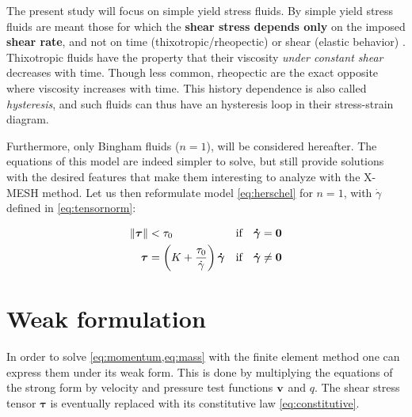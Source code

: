 \documentclass[11 pt]{report}
\begin{document}
The present study will focus on simple yield stress fluids. By simple yield stress fluids are meant those for which the \textbf{shear stress depends only} on the imposed \textbf{shear rate}, and not on time (thixotropic/rheopectic) or shear (elastic behavior) \cite{simpleyield}. Thixotropic fluids have the property that their viscosity \textit{under constant shear} decreases with time. Though less common, rheopectic are the exact opposite where viscosity increases with time. This history dependence is also called \textit{hysteresis}, and such fluids can thus have an hysteresis loop in their stress-strain diagram. 

Furthermore, only Bingham fluids ($n=1$), will be considered hereafter. The equations of this model are indeed simpler to solve, but still provide solutions with the desired features that make them interesting to analyze with the X-MESH method. Let us then reformulate model \eqref{eq:herschel} for $n=1$, with $\dot\gamma$ defined in \eqref{eq:tensornorm}:
\begin{empheqboxed}
    \begin{equation}
        \begin{aligned}
            \|\boldsymbol\tau\| &< \tau_0 & \text{if} \quad \gam = \mathbf{0} \\ %
            \boldsymbol{\tau} &= \left(K + \frac{\tau_0}{\dot \gamma}\right) \gam & \text{if} \quad  \gam \neq \mathbf{0} %
        \end{aligned}
        \label{eq:constitutive}
    \end{equation}
\end{empheqboxed}

\section{Weak formulation}
In order to solve \cref{eq:momentum,eq:mass} with the finite element method one can express them under its weak form. This is done by multiplying the equations of the strong form by velocity and pressure test functions $\mathbf{v}$ and $q$. The shear stress tensor $\boldsymbol\tau$ is eventually replaced with its constitutive law \cref{eq:constitutive}.
\end{document}
